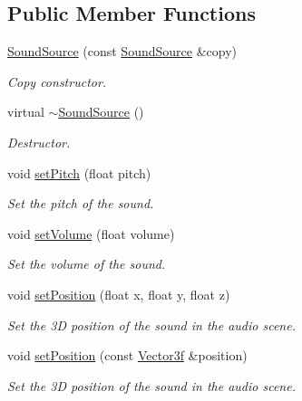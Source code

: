 \subsection*{Public Member Functions}
\begin{DoxyCompactItemize}
\item 
\mbox{\hyperlink{classsf_1_1_sound_source_ae0c7728c1449fdebe65749ab6fcb3170}{Sound\+Source}} (const \mbox{\hyperlink{classsf_1_1_sound_source}{Sound\+Source}} \&copy)
\begin{DoxyCompactList}\small\item\em Copy constructor. \end{DoxyCompactList}\item 
virtual \mbox{\hyperlink{classsf_1_1_sound_source_a77c7c1524f8cb81df2de9375b0f87c5c}{$\sim$\+Sound\+Source}} ()
\begin{DoxyCompactList}\small\item\em Destructor. \end{DoxyCompactList}\item 
void \mbox{\hyperlink{classsf_1_1_sound_source_a72a13695ed48b7f7b55e7cd4431f4bb6}{set\+Pitch}} (float pitch)
\begin{DoxyCompactList}\small\item\em Set the pitch of the sound. \end{DoxyCompactList}\item 
void \mbox{\hyperlink{classsf_1_1_sound_source_a2f192f2b49fb8e2b82f3498d3663fcc2}{set\+Volume}} (float volume)
\begin{DoxyCompactList}\small\item\em Set the volume of the sound. \end{DoxyCompactList}\item 
void \mbox{\hyperlink{classsf_1_1_sound_source_a0480257ea25d986eba6cc3c1a6f8d7c2}{set\+Position}} (float x, float y, float z)
\begin{DoxyCompactList}\small\item\em Set the 3D position of the sound in the audio scene. \end{DoxyCompactList}\item 
void \mbox{\hyperlink{classsf_1_1_sound_source_a17ba9ed01925395652181a7b2a7d3aef}{set\+Position}} (const \mbox{\hyperlink{classsf_1_1_vector3}{Vector3f}} \&position)
\begin{DoxyCompactList}\small\item\em Set the 3D position of the sound in the audio scene. \end{DoxyCompactList}\item 

\end{DoxyCompactItemize}
